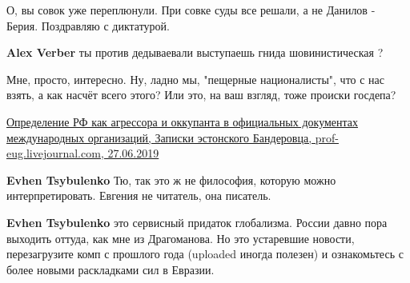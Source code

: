 \begin{itemize}
\begin{itemize}
О, вы совок уже переплюнули. При совке суды все решали, а не Данилов - Берия. Поздравляю с диктатурой.

 
\textbf{Alex Verber} ты против дедываевали выступаешь гнида шовинистическая ?

 

Мне, просто, интересно. Ну, ладно мы, "пещерные националисты", что с нас взять,
а как насчёт всего этого? Или это, на ваш взгляд, тоже происки госдепа?

\href{https://prof-eug.livejournal.com/718912.html}{%
Определение РФ как агрессора и оккупанта в официальных документах международных организаций, %
Записки эстонского Бандеровца, %
prof-eug.livejournal.com, 27.06.2019%
}

\begin{itemize}
 
\textbf{Evhen Tsybulenko} Тю, так это ж не философия, которую можно интерпретировать. Евгения не читатель, она писатель.

 
\textbf{Evhen Tsybulenko} это сервисный придаток глобализма. России давно пора выходить оттуда, как мне из Драгоманова. Но это устаревшие новости, перезагрузите комп с прошлого года (uploaded иногда полезен) и ознакомьтесь с более новыми раскладками сил в Евразии.

 

\end{itemize}
\end{itemize}
\end{itemize}
